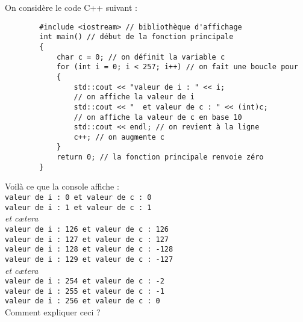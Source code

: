 \begin{exercice}
    On considère le code \textsc{C++} suivant :
    \begin{verbatim}
        #include <iostream> // bibliothèque d'affichage
        int main() // début de la fonction principale
        {
            char c = 0; // on définit la variable c
            for (int i = 0; i < 257; i++) // on fait une boucle pour
            {
                std::cout << "valeur de i : " << i;
                // on affiche la valeur de i
                std::cout << "  et valeur de c : " << (int)c;
                // on affiche la valeur de c en base 10
                std::cout << endl; // on revient à la ligne
                c++; // on augmente c
            }
            return 0; // la fonction principale renvoie zéro
        }
\end{verbatim}

    Voilà ce que la console affiche :\\

    \texttt{valeur de i : 0  et valeur de c : 0}\\
    \texttt{valeur de i : 1  et valeur de c : 1}\\
    \textit{et c\ae tera}\\
    \texttt{valeur de i : 126  et valeur de c : 126}\\
    \texttt{valeur de i : 127  et valeur de c : 127}\\
    \texttt{valeur de i : 128  et valeur de c : -128}\\
    \texttt{valeur de i : 129  et valeur de c : -127}\\
    \textit{et c\ae tera}\\
    \texttt{valeur de i : 254  et valeur de c : -2}\\
    \texttt{valeur de i : 255  et valeur de c : -1}\\
    \texttt{valeur de i : 256  et valeur de c : 0}\\

    Comment expliquer ceci ?
\end{exercice}
